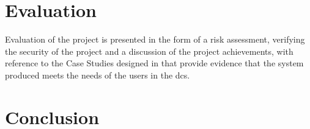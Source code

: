 \documentclass[british,table,svgnames,xcdraw]{l4proj}
\begin{document}
\chapter{Evaluation}
\label{ch:evaluation}

Evaluation of the project is presented in the form of a risk assessment, verifying the security of the project and a discussion of the project achievements, with reference to the Case Studies designed in  that provide evidence that the system produced meets the needs of the users in the \acrfull{dcs}.







\chapter{Conclusion}
\label{ch:conclusion}



%
%









\newpage

\printnoidxglossaries
\end{document}
